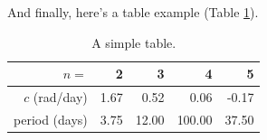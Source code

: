 And finally, here's a table example (Table \ref{tab:taba}).
\begin{table}[hbtp]
\caption{\label{tab:taba}A simple table.}
\begin{center}
\begin{tabular}{|r|r|r|r|r|}
\hline
$n=$&2&3&4&5\\
\hline
$c$ (rad/day)&1.67&0.52&0.06&-0.17\\
\hline
period (days)&3.75&12.00&100.00&37.50\\
\hline
\end{tabular}
\end{center}
\end{table}
